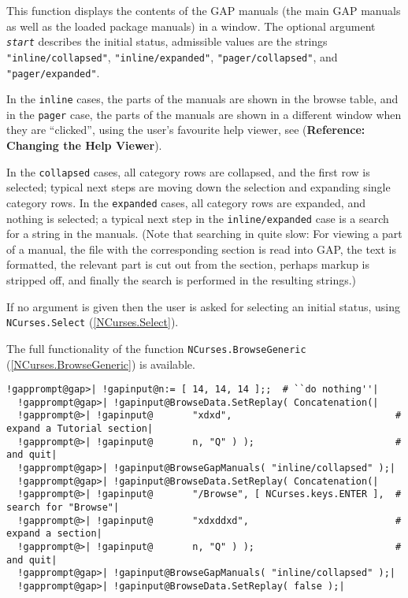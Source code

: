 \documentclass[a4paper,11pt]{report}
\begin{document}
{{{ This function displays the contents of the \textsf{GAP} manuals (the main \textsf{GAP} manuals as well as the loaded package manuals) in a window. The optional
argument \mbox{\texttt{\mdseries\slshape start}} describes the initial status, admissible values are the strings \texttt{"inline/collapsed"}, \texttt{"inline/expanded"}, \texttt{"pager/collapsed"}, and \texttt{"pager/expanded"}. 

 In the \texttt{inline} cases, the parts of the manuals are shown in the browse table, and in the \texttt{pager} case, the parts of the manuals are shown in a different window when they are ``clicked'', using the user's favourite help viewer, see  (\textbf{Reference: Changing the Help Viewer}). 

 In the \texttt{collapsed} cases, all category rows are collapsed, and the first row is selected; typical
next steps are moving down the selection and expanding single category rows.
In the \texttt{expanded} cases, all category rows are expanded, and nothing is selected; a typical next
step in the \texttt{inline/expanded} case is a search for a string in the manuals. (Note that searching in quite
slow: For viewing a part of a manual, the file with the corresponding section
is read into \textsf{GAP}, the text is formatted, the relevant part is cut out from the section,
perhaps markup is stripped off, and finally the search is performed in the
resulting strings.) 

 If no argument is given then the user is asked for selecting an initial
status, using \texttt{NCurses.Select} (\ref{NCurses.Select}). 

 The full functionality of the function \texttt{NCurses.BrowseGeneric} (\ref{NCurses.BrowseGeneric}) is available. 

 
\begin{Verbatim}[commandchars=!@|,fontsize=\small,frame=single,label=Example]
  !gapprompt@gap>| !gapinput@n:= [ 14, 14, 14 ];;  # ``do nothing''|
  !gapprompt@gap>| !gapinput@BrowseData.SetReplay( Concatenation(|
  !gapprompt@>| !gapinput@       "xdxd",                             # expand a Tutorial section|
  !gapprompt@>| !gapinput@       n, "Q" ) );                         # and quit|
  !gapprompt@gap>| !gapinput@BrowseGapManuals( "inline/collapsed" );|
  !gapprompt@gap>| !gapinput@BrowseData.SetReplay( Concatenation(|
  !gapprompt@>| !gapinput@       "/Browse", [ NCurses.keys.ENTER ],  # search for "Browse"|
  !gapprompt@>| !gapinput@       "xdxddxd",                          # expand a section|
  !gapprompt@>| !gapinput@       n, "Q" ) );                         # and quit|
  !gapprompt@gap>| !gapinput@BrowseGapManuals( "inline/collapsed" );|
  !gapprompt@gap>| !gapinput@BrowseData.SetReplay( false );|
\end{Verbatim}
 

}}}
\end{document}
